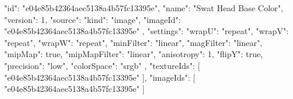 {
  "id": "e04e85b42364aec5138a4b57fc13395e",
  "name": "Swat Head Base Color",
  "version": 1,
  "source": {
    "kind": "image",
    "imageId": "e04e85b42364aec5138a4b57fc13395e"
  },
  "settings": {
    "wrapU": "repeat",
    "wrapV": "repeat",
    "wrapW": "repeat",
    "minFilter": "linear",
    "magFilter": "linear",
    "mipMap": true,
    "mipMapFilter": "linear",
    "anisotropy": 1,
    "flipY": true,
    "precision": "low",
    "colorSpace": "srgb"
  },
  "textureIds": [
    "e04e85b42364aec5138a4b57fc13395e"
  ],
  "imageIds": [
    "e04e85b42364aec5138a4b57fc13395e"
  ]
}
